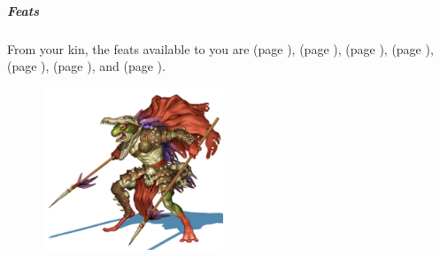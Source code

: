     \subparagraph{Feats} From your kin, the feats available to you are
    \textbf{} (page \pageref{feat::}),
    \textbf{} (page \pageref{feat::}),
    \textbf{} (page \pageref{feat::}),
    \textbf{} (page \pageref{feat::}),
    \textbf{} (page \pageref{feat::}),
    \textbf{} (page \pageref{feat::}), and
    \textbf{} (page \pageref{feat::}).

\begin{figure}[!b]
    \centering
    \includegraphics[width=0.48\textwidth]{04kins/img/18grung_warrior.jpg}
\end{figure}

\newpage
